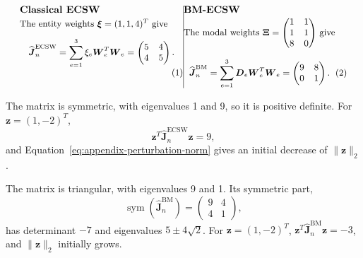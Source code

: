 \documentclass[a4paper,12pt]{article}
\newcommand{\vect}[1]{\boldsymbol{#1}}
\newcommand{\matr}[1]{\boldsymbol{#1}}
\begin{document}
\begin{subequations}
 \label{eq:appendix-symmetric-example-matrices}
 \noindent
 \begin{minipage}[t]{0.48\linewidth}
  \vspace{0pt}\raggedright
  \textbf{Classical ECSW}\par\smallskip
  \small
  The entity weights $\vect{\xi}=(1,1,4)^T$ give
  \begin{equation}
   \widehat{\matr{J}}_n^{\mathrm{ECSW}}
   =\sum_{e=1}^{3}\xi_e\matr{W}_e^T\matr{W}_e
   =\begin{pmatrix}5&4\\4&5\end{pmatrix}.
  \end{equation}
 \end{minipage}\hfill\vrule width 0.4pt\hfill%
 \begin{minipage}[t]{0.48\linewidth}
  \vspace{0pt}\raggedright
  \textbf{BM-ECSW}\par\smallskip
  \small
  The modal weights $\matr{\Xi}=\begin{pmatrix}1&1\\1&1\\8&0\end{pmatrix}$ give
  \begin{equation}
   \widehat{\matr{J}}_n^{\mathrm{BM}}
   =\sum_{e=1}^{3}\matr{D}_e\matr{W}_e^T\matr{W}_e
   =\begin{pmatrix}9&8\\0&1\end{pmatrix}.
  \end{equation}
 \end{minipage}
\end{subequations}

\noindent
\begin{minipage}[t]{0.48\linewidth}
 \vspace{0pt}\small\raggedright
 The matrix is symmetric, with eigenvalues 1 and 9, so it is positive definite. For $\vect{z}=(1,-2)^T$,
 \[
  \vect{z}^T\widehat{\matr{J}}_n^{\mathrm{ECSW}}\vect{z}=9,
 \]
 and Equation~\eqref{eq:appendix-perturbation-norm} gives an initial decrease of $\|\vect{z}\|_2$.
\end{minipage}\hfill\vrule width 0.4pt\hfill%
\begin{minipage}[t]{0.48\linewidth}
 \vspace{0pt}\small\raggedright
 The matrix is triangular, with eigenvalues 9 and 1. Its symmetric part,
 \[
  \operatorname{sym}(\widehat{\matr{J}}_n^{\mathrm{BM}})
  =\begin{pmatrix}9&4\\4&1\end{pmatrix},
 \]
 has determinant $-7$ and eigenvalues $5\pm4\sqrt2$. For $\vect{z}=(1,-2)^T$, $\vect{z}^T\widehat{\matr{J}}_n^{\mathrm{BM}}\vect{z}=-3$, and $\|\vect{z}\|_2$ initially grows.
\end{minipage}
\end{document}
